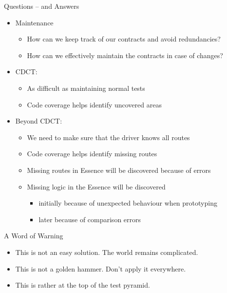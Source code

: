 \begin{frame}[fragile]{Questions -- and Answers}

\begin{itemize}
\item Maintenance
\begin{itemize}
\item How can we keep track of our contracts and avoid redundancies?
\item How can we effectively maintain the contracts in case of changes?
\end{itemize}
\end{itemize}

\onslide<+->
\begin{itemize}[<+->]
\item CDCT:
\begin{itemize}
\item As difficult as maintaining normal tests
\item Code coverage helps identify uncovered areas
\end{itemize}
\vspace{.4em}
\item Beyond CDCT:
\begin{itemize}
\item We need to make sure that the driver knows all routes
\item Code coverage helps identify missing routes
\item Missing routes in Essence will be discovered because of errors
\item Missing logic in the Essence will be discovered
\begin{itemize}
\item initially because of unexpected behaviour when prototyping
\item later because of comparison errors
\end{itemize}
\end{itemize}
\end{itemize}

\end{frame}


\begin{frame}[fragile]{A Word of Warning}

\begin{itemize}[<+->]
\item This is not an easy solution. The world remains complicated.
\item This is not a golden hammer. Don't apply it everywhere.
\item This is rather at the top of the test pyramid.
\end{itemize}

\end{frame}


